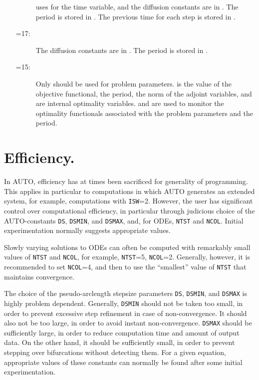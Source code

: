 \documentclass[12pt]{report}
\begin{document}
\begin{itemize}
\begin{description}
  \AUTO uses  for the time variable, and the diffusion 
  constants are in . The period is stored in
  . The previous time for each step is stored in .
\item[\parf{IPS}=17:]
  The diffusion constants are in .
  The period is stored in .
\item[\parf{IPS}=15:]
  Only  should be used for problem parameters.
   is the value of the objective
  functional,  the period,  the norm of the
  adjoint variables,  and  are internal optimality
  variables.  and  are used to monitor the 
  optimality functionals associated with the problem parameters and
  the period.
\end{description}
\end{itemize}

\section{ Efficiency.} \label{sec:Efficiency}
In {\cal AUTO}, efficiency has at times been sacrificed for generality of programming.
This applies in particular to computations in which {\cal AUTO} generates
an extended system, for example, computations with {\tt ISW}=2.
However, the user has significant control over computational efficiency,
in particular through judicious choice of the {\cal AUTO}-constants  
{\tt DS}, {\tt DSMIN}, and {\tt DSMAX}, and, for ODEs, {\tt NTST} and {\tt NCOL}.
Initial experimentation normally suggests appropriate values.

Slowly varying solutions to ODEs can often 
be computed with remarkably small values of {\tt NTST} and {\tt NCOL}, 
for example, {\tt NTST}=5,  {\tt NCOL}=2.
Generally, however, it is recommended to set {\tt NCOL}=4,
and then to use the ``smallest'' value of {\tt NTST} that maintains convergence.

The choice of the pseudo-arclength stepsize parameters
{\tt DS}, {\tt DSMIN}, and {\tt DSMAX}
is highly problem dependent.
Generally, {\tt DSMIN} should not be taken too small,
in order to prevent excessive step refinement in case of non-convergence.
It should also not be too large, in order to avoid instant non-convergence.
{\tt DSMAX} should be sufficiently large, in order to reduce computation time
and amount of output data.
On the other hand, it should be sufficiently small, in order to prevent
stepping over bifurcations without detecting them.
For a given equation, appropriate values of these constants 
can normally be found after some initial experimentation.
\end{document}
